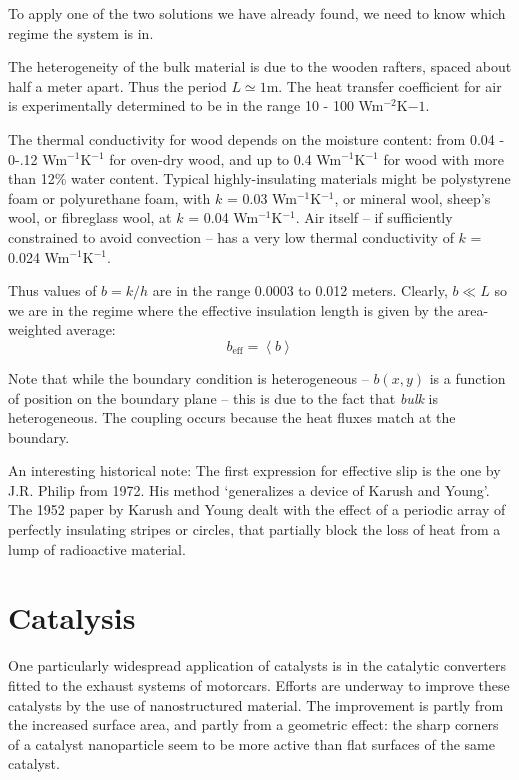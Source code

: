 \documentclass[a4paper]{report}
\newcommand{\beff}{\ensuremath{b_{\mathrm{eff}}}}
\begin{document}
To apply one of the two solutions we have already found, we need to know which regime the system is in.

The heterogeneity of the bulk material is due to the wooden rafters, spaced about half a meter apart.  Thus the period $L \simeq 1$m.
The heat transfer coefficient for air is experimentally determined to be in the range 10 - 100 Wm$^{-2}$K${-1}$.

The thermal conductivity for wood depends on the moisture content: from 0.04 - 0-.12 Wm$^{-1}$K$^{-1}$ for oven-dry wood, and up to 0.4 Wm$^{-1}$K$^{-1}$ for wood with more than 12\% water content.
Typical highly-insulating materials might be polystyrene foam or polyurethane foam, with $k$ = 0.03 Wm$^{-1}$K$^{-1}$, or mineral wool, sheep's wool, or fibreglass wool, at $k$ = 0.04 Wm$^{-1}$K$^{-1}$.
Air itself -- if sufficiently constrained to avoid convection -- has a very low thermal conductivity of $k$ = 0.024 Wm$^{-1}$K$^{-1}$.

Thus values of $b = k/h$ are in the range 0.0003 to 0.012 meters.  Clearly, $b \ll L$ so we are in the regime where the effective insulation length is given by the area-weighted average:
\begin{equation}
\beff = \left< b \right>
\end{equation}


\vspace{1em}
Note that while the boundary condition is heterogeneous -- $b(x,y)$ is a function of position on the boundary plane -- this is due to the fact that \emph{bulk} is heterogeneous.  The coupling occurs because the heat fluxes match at the boundary.

\vspace{1em}
An interesting historical note: The first expression for effective slip is the one by J.R. Philip from 1972.  His method `generalizes a device of Karush and Young'.  The 1952 paper by Karush and Young
dealt with the effect of a periodic array of perfectly insulating stripes or circles, that partially block the loss of heat from a lump of radioactive material.


\section*{Catalysis}

One particularly widespread application of catalysts is in the catalytic converters fitted to the exhaust systems of motorcars.  Efforts are underway to improve these catalysts by the use of nanostructured material.  The improvement is partly from the increased surface area, and partly from a geometric effect: the sharp corners of a catalyst nanoparticle seem to be more active than flat surfaces of the same catalyst.
\end{document}
